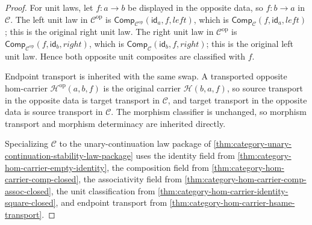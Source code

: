 \begin{proof}
For unit laws, let $f:a\to b$ be displayed in the opposite data, so
$f:b\to a$ in $\mathcal C$. The left unit law in $\mathcal C^{\mathrm{op}}$ is
$\mathsf{Comp}_{\mathcal C^{\mathrm{op}}}(\mathsf{id}_a,f,left)$, which is
$\mathsf{Comp}_{\mathcal C}(f,\mathsf{id}_a,left)$; this is the original right
unit law. The right unit law in $\mathcal C^{\mathrm{op}}$ is
$\mathsf{Comp}_{\mathcal C^{\mathrm{op}}}(f,\mathsf{id}_b,right)$, which is
$\mathsf{Comp}_{\mathcal C}(\mathsf{id}_b,f,right)$; this is the original left
unit law. Hence both opposite unit composites are classified with $f$.

Endpoint transport is inherited with the same swap. A transported opposite
hom-carrier $\mathcal H^{\mathrm{op}}(a,b,f)$ is the original carrier
$\mathcal H(b,a,f)$, so source transport in the opposite data is target
transport in $\mathcal C$, and target transport in the opposite data is source
transport in $\mathcal C$. The morphism classifier is unchanged, so morphism
transport and morphism determinacy are inherited directly.

Specializing $\mathcal C$ to the unary-continuation law package of
\autoref{thm:category-unary-continuation-stability-law-package} uses the
identity field from \autoref{thm:category-hom-carrier-empty-identity}, the
composition field from \autoref{thm:category-hom-carrier-comp-closed}, the
associativity field from \autoref{thm:category-hom-carrier-comp-assoc-closed},
the unit classification from \autoref{thm:category-hom-carrier-identity-square-closed},
and endpoint transport from \autoref{thm:category-hom-carrier-hsame-transport}.
\end{proof}

